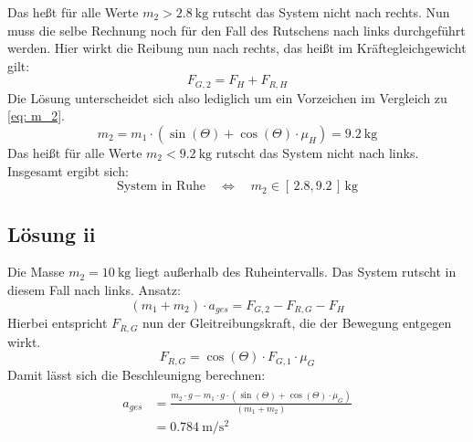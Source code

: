 Das heßt für alle Werte $m_2 > \SI{2.8}{\kilo\gram}$ rutscht das System nicht nach rechts. Nun muss die selbe Rechnung noch für den Fall des Rutschens nach
links durchgeführt werden. Hier wirkt die Reibung nun nach rechts, das heißt im Kräftegleichgewicht gilt:
\begin{equation}
  F_{G,2}  = F_H + F_{R,H}
\end{equation}
Die Lösung unterscheidet sich also lediglich um ein Vorzeichen im Vergleich zu \eqref{eq: m_2}.
\begin{equation}
  m_2 = m_1 \cdot (\sin\left(\Theta\right) + \cos\left(\Theta\right)  \cdot \mu_H) = \SI{9.2}{\kilo\gram}
\end{equation}
Das heißt für alle Werte $m_2 < \SI{9.2}{\kilo\gram}$ rutscht das System nicht nach links. Insgesamt ergibt sich:
\begin{equation}
  \text{System in Ruhe} \quad \Leftrightarrow \quad m_2 \in \left[\,2.8,9.2\,\right]\,\si{\kilo\gram}
\end{equation}
\subsection{Lösung ii}
Die Masse $m_2 = \SI{10}{\kilo\gram}$ liegt außerhalb des Ruheintervalls. Das System rutscht in diesem Fall nach links. Ansatz:
\begin{equation}
  (m_1 + m_2) \cdot a_{ges} = F_{G,2} - F_{R, G} - F_H
\end{equation}
Hierbei entspricht $F_{R, G}$ nun der Gleitreibungskraft, die der Bewegung entgegen wirkt.
\begin{equation}
  F_{R, G} = \cos\left(\Theta\right) \cdot F_{G,1} \cdot \mu_G
\end{equation}
Damit lässt sich die Beschleunigng berechnen:
\begin{align}
  \begin{aligned}
    a_{ges} &= \frac{m_2 \cdot g - m_1 \cdot g\cdot(\sin\left(\Theta\right) + \cos\left(\Theta\right)\cdot \mu_G)}{(m_1 + m_2)} \\
            &= \SI{0.784}{\meter\per\second^2}
\end{aligned}
\end{align}


\newpage
